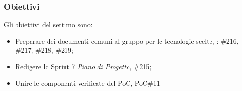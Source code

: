 \subsubsection{Obiettivi}
\label{sec:sprint7_obiettivi}
Gli obiettivi del settimo  sono:
\begin{itemize}
    \item Preparare dei documenti comuni al gruppo per le tecnologie scelte, : \#216, \#217, \#218, \#219;
    \item Redigere lo Sprint 7 \textit{Piano di Progetto},  \#215;
    \item Unire le componenti verificate del PoC,  PoC\#11;
\end{itemize}